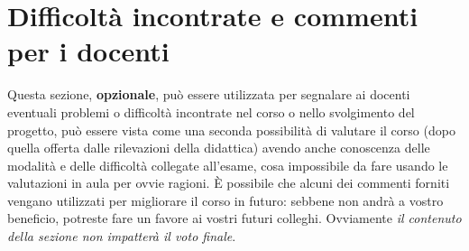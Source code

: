 \documentclass[a4paper,12pt]{report}
\begin{document}
\section{Difficoltà incontrate e commenti per i docenti}

Questa sezione, \textbf{opzionale}, può essere utilizzata per segnalare ai docenti eventuali problemi o difficoltà incontrate nel corso o nello svolgimento del progetto, può essere vista come una seconda possibilità di valutare il corso (dopo quella offerta dalle rilevazioni della didattica) avendo anche conoscenza delle modalità e delle difficoltà collegate all'esame, cosa impossibile da fare usando le valutazioni in aula per ovvie ragioni.
%
È possibile che alcuni dei commenti forniti vengano utilizzati per migliorare il corso in futuro: sebbene non andrà a vostro beneficio, potreste fare un favore ai vostri futuri colleghi.
%
Ovviamente \textit{il contenuto della sezione non impatterà il voto finale}.
\end{document}
